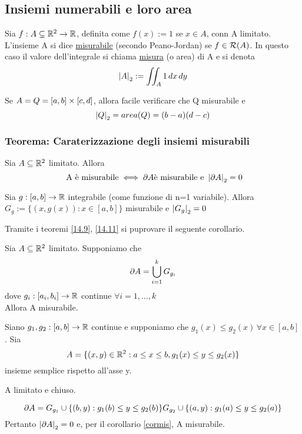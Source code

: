\subsection{Insiemi numerabili e loro area}
\begin{definition}
  Sia $f: A \subseteq \mathbb{R}^2 \to \mathbb{R}$, definita come $f(x):=1$ se $x\in A$, conn A limitato. L'insieme A si dice \underline{misurabile}
  (secondo Peano-Jordan) se $f \in \mathcal{R}(A)$. In questo caso il valore dell'integrale si chiama
  \underline{misura} (o area) di A e si denota $$\left\lvert A \right\rvert_2 := \iint_{A} 1 \,dx\,dy$$ 
\end{definition}
\begin{osservazione}
  Se $A = Q = [a,b]\times[c,d]$, allora \ace facile verificare che Q \ace misurabile e 
  $$\left\lvert Q \right\rvert_2 = area(Q) = (b-a)(d-c)$$
\end{osservazione}
\subsubsection{Teorema: Caraterizzazione degli insiemi misurabili}
\begin{theorem}
  \label{14.9}
  Sia $A \subseteq \mathbb{R}^2$ limitato. Allora 
  $$\text{ A \`e misurabile} \iff \partial A \text{\`e misurabile e } \left\lvert \partial A \right\rvert_2 = 0$$
\end{theorem}
\begin{theorem}[BDPG, 14.11]
  \label{14.11}
  Sia $g:[a,b]\to \mathbb{R}$ integrabile (come funzione di n=1 variabile). Allora 
  $G_{g} := \{(x,g(x)) : x \in [a,b]\}$ \ace misurabile e $\left\lvert G_{g} \right\rvert_2 = 0$
\end{theorem}
Tramite i teoremi \ref{14.9}, \ref{14.11} si pu\aco provare il seguente corollario.
\begin{corollary}
  \label{cormis}
  Sia $A \subseteq \mathbb{R}^2$ limitato. Supponiamo che 
  $$\partial A = \bigcup_{i = 1}^k G_{g_i}$$ dove $g_{i} : [a_i,b_i] \to \mathbb{R}$ continue $\forall i = 1, ..., k$\\
  Allora A \ace misurabile.
\end{corollary}
\begin{example}
  Siano $g_1,g_2 : [a,b]\to \mathbb{R}$ continue e supponiamo che $g_1(x) \leq g_2(x) \, \forall x\in [a,b]$. Sia
  $$A = \{(x,y)\in \mathbb{R}^2 : a \leq x \leq b, g_1(x) \leq y \leq g_2(x)\}$$
  insieme semplice rispetto all'asse y.
  \begin{exercise}
    A \ace limitato e chiuso.
  \end{exercise}
  $$\partial A = G_{g_1} \cup \{(b,y) : g_{1}(b) \leq y \leq g_2(b)\} G_{g_2} \cup \{(a,y) : g_{1}(a) \leq y \leq g_2(a)\}$$
  Pertanto $\left\lvert \partial A \right\rvert_2 = 0$ e, per il corollario \ref{cormis}, A \ace misurabile.
\end{example}
